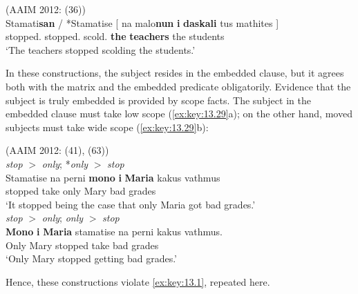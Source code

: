 \documentclass[output=paper]{langsci/langscibook}
\begin{document}
\ea%
\label{ex:key:13.28} (AAIM 2012: (36))\\
    \gll  Stamati\textbf{san} / *Stamatise [ na malo\textbf{nun} \textbf{i} \textbf{daskali} tus mathites ] \\
        stopped.\textbf{\Tpl} {}  \hphantom{*}stopped.\Tsg{} {} \Sbjv{} scold.\textbf{\Tpl} \textbf{the} \textbf{teachers}  the students\\
    \glt  ‘The teachers stopped scolding the students.’
\z

In these constructions, the subject resides in the embedded clause, but it
agrees both with the matrix and the embedded predicate obligatorily. Evidence
that the subject is truly embedded is provided by scope facts. The subject in
the embedded clause must take low scope (\ref{ex:key:13.29}a); on the other hand,
moved subjects must take wide scope (\ref{ex:key:13.29}b):

\ea%
    \label{ex:key:13.29} (AAIM 2012: (41), (63))\\
	\ea \emph{stop} $>$ \emph{only}; *\emph{only} $>$ \emph{stop}\\
	\gll  Stamatise na perni  \textbf{mono} \textbf{i} \textbf{Maria}  kakus vathmus\\
	    stopped \Sbjv{} take only   Mary bad grades\\
	\glt ‘It stopped being the case that only Maria got bad grades.’\\
	\ex \makebox[0pt][r]{*}\emph{stop} $>$ \emph{only}; \emph{only} $>$ \emph{stop}\\
	\gll  \textbf{Mono} \textbf{i} \textbf{Maria} stamatise na perni kakus vathmus.\\
	    Only Mary stopped \Sbjv{} take bad grades\\
	\glt   ‘Only Mary stopped getting bad grades.’
    \z
\z

Hence, these constructions violate \eqref{ex:key:13.1}, repeated here.
\end{document}
